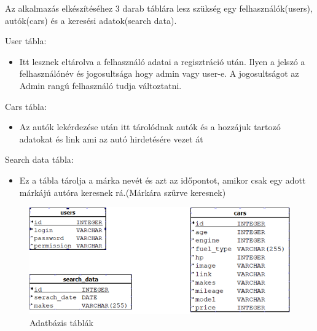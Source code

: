 
Az alkalmazás elkészítéséhez 3 darab táblára lesz szükség egy
felhasználók(users), autók(cars) és a keresési adatok(search data).

User tábla:
\begin{itemize}
\item Itt lesznek eltárolva a felhasználó adatai a regisztráció után. Ilyen a jelszó a felhasználónév és jogosultsága hogy admin vagy user-e. A jogosultságot az Admin rangú felhasználó tudja változtatni.
\end{itemize}

Cars tábla:
\begin{itemize}
\item Az autók lekérdezése után itt tárolódnak autók és a hozzájuk tartozó adatokat és link ami az autó hirdetésére vezet át
\end{itemize}

Search data tábla:
\begin{itemize}
\item Ez a tábla tárolja a márka nevét és azt az időpontot, amikor csak egy adott márkájú autóra keresnek rá.(Márkára szűrve keresnek)
\end{itemize}
 
 \begin{figure}[h]
\centering
\includegraphics[scale=0.8]{images/DataTable.png}
\caption{Adatbázis táblák}
\label{fig:DataTable}
\end{figure}
 
